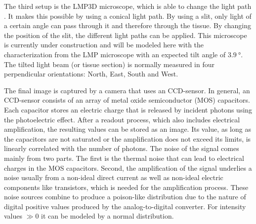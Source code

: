 % 
The third setup is the \ac{LMP3D}  microscope, which is able to change the light path \cite{Wiese:887678}.
It makes this possible by using a conical light path.
By using a slit, only light of a certain angle can pass through it and therefore through the tissue.
By changing the position of the slit, the different light paths can be applied.
This microscope is currently under construction and will be modeled here with the characterization from the \ac{LMP} microscope with an expected tilt angle of $\SI{3.9}{\degree}$.
The tilted light beam (or tissue section) is normally measured in four perpendicular orientations: North, East, South and West.
\par
%
The final image is captured by a camera that uses an \ac{CCD}-sensor.
In general, an \ac{CCD}-sensor consists of an array of metal oxide semiconductor (MOS) capacitors.
Each capacitor stores an electric charge that is released by incident photons using the photoelectric effect.
After a readout process, which also includes electrical amplification, the resulting values can be stored as an image.
Its value, as long as the capacitors are not saturated or the amplification does not exceed its limits, is linearly correlated with the number of photons.
The noise of the signal comes mainly from two parts.
The first is the thermal noise that can lead to electrical charges in the MOS capacitors.
Second, the amplification of the signal underlies a noise usually from a non-ideal direct current as well as non-ideal electric components like transistors, which is needed for the amplification process.
These noise sources combine to produce a poison-like distribution due to the nature of digital positive values produced by the analog-to-digital converter.
For intensity values $\gg 0$ it can be modeled by a normal distribution.
%
%
%
